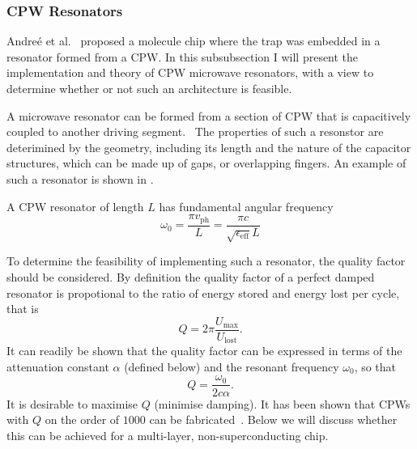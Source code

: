 \begin{figure}
  \caption{
  }
  \label{experiment:fig:CPWtaper}
\end{figure}

\subsubsection{CPW Resonators}

Andre\'e et al.~\cite{Andre2006} proposed a molecule chip where the trap was
embedded in a resonator formed from a CPW. In this subsubsection I will present
the implementation and theory of CPW microwave resonators, with a view to
determine whether or not such an architecture is feasible.

A microwave resonator can be formed from a section of CPW that is capacitively
coupled to another driving segment.~\cite{Day2003} The properties of such a
resonstor are deterimined by the geometry, including its length and the nature
of the capacitor structures, which can be made up of gaps, or overlapping
fingers. An example of such a resonator is shown in
.~\cite{doi:10.1063/1.3010859} 

\begin{figure}
  \caption{
  }
  \label{experiment:fig:resonator}
\end{figure}

A CPW resonator of length $L$ has fundamental angular frequency
\begin{equation}
  \omega_0 = \frac{\pi v_\mathrm{ph}}{L} = \frac{\pi
  c}{\sqrt{\epsilon_\text{eff}} L}
\end{equation}

To determine the feasibility of implementing such a resonator, the quality
factor should be considered. By definition the quality factor of a perfect
damped resonator is propotional to the ratio of energy stored and energy lost
per cycle, that is~
\begin{equation}
  Q = 2\pi\frac{U_\mathrm{max}}{U_\mathrm{lost}}.
  \label{experiment:mw:eqn:Qdef}
\end{equation}
It can readily be shown that the quality factor can be expressed in terms of the
attenuation constant $\alpha$ (defined below) and the resonant frequency
$\omega_0$, so that~\cite{Simons2004}
\begin{equation}
  Q = \frac{\omega_0}{2c\alpha}.
  \label{experiment:mw:eqn:Qalpha}
\end{equation}
It is desirable to maximise $Q$ (minimise damping). It has been shown that CPWs
with $Q$ on the order of $1000$ can be fabricated~. Below we will discuss whether this can be achieved for a multi-layer,
non-superconducting chip.

